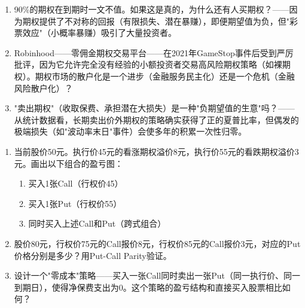 \documentclass[a4paper,11pt]{ctexbook}
\begin{document}
\begin{discuss}
\begin{enumerate}
  \item 90\%的期权在到期时一文不值。如果这是真的，为什么还有人买期权？——因为期权提供了不对称的回报（有限损失、潜在暴赚），即便期望值为负，但"彩票效应"（小概率暴赚）吸引了大量投资者。
  \item Robinhood——零佣金期权交易平台——在2021年GameStop事件后受到严厉批评，因为它允许完全没有经验的小额投资者交易高风险期权策略（如裸期权）。期权市场的散户化是一个进步（金融服务民主化）还是一个危机（金融风险散户化）？
  \item "卖出期权"（收取保费、承担潜在大损失）是一种"负期望值的生意"吗？——从统计数据看，长期卖出价外期权的策略确实获得了正的夏普比率，但偶发的极端损失（如"波动率末日"事件）会使多年的积累一次性归零。
\end{enumerate}
\end{discuss}

\begin{exercises}
\begin{enumerate}
  \item 当前股价50元。执行价45元的看涨期权溢价8元，执行价55元的看跌期权溢价3元。画出以下组合的盈亏图：
  \begin{enumerate}
    \item 买入1张Call（行权价45）
    \item 买入1张Put（行权价55）
    \item 同时买入上述Call和Put（跨式组合）
  \end{enumerate}
  \item 股价80元，行权价75元的Call报价8元，行权价85元的Call报价3元，对应的Put价格分别是多少？用Put-Call Parity验证。
  \item 设计一个"零成本"策略——买入一张Call同时卖出一张Put（同一执行价、同一到期日），使得净保费支出为0。这个策略的盈亏结构和直接买入股票相比如何？
\end{enumerate}
\end{exercises}
\end{document}
